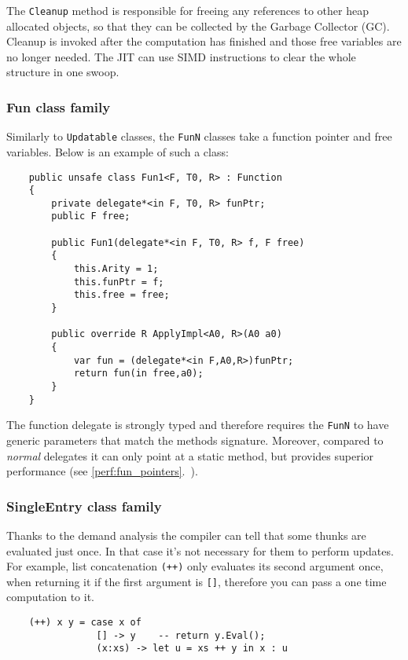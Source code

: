 \documentclass[en]{pracamgr}
\newcommand{\myref}[1]{\ref{#1}.~\textit{\nameref{#1}}}
\begin{document}
The \texttt{Cleanup} method is responsible for freeing
any references to other heap allocated objects, so that
they can be collected by the Garbage Collector (GC).
Cleanup is invoked after the computation has finished
and those free variables are no longer needed.
The JIT can use SIMD instructions to clear the whole
structure in one swoop.

\subsubsection{Fun class family}

Similarly to \texttt{Updatable} classes, the \texttt{FunN}
classes take a function pointer and free variables.
Below is an example of such a class:

\begin{verbatim}
    public unsafe class Fun1<F, T0, R> : Function
    {
        private delegate*<in F, T0, R> funPtr;
        public F free;

        public Fun1(delegate*<in F, T0, R> f, F free)
        {
            this.Arity = 1;
            this.funPtr = f;
            this.free = free;
        }

        public override R ApplyImpl<A0, R>(A0 a0)
        {
            var fun = (delegate*<in F,A0,R>)funPtr;
            return fun(in free,a0);
        }
    }
\end{verbatim}

The function delegate is strongly typed and therefore
requires the \texttt{FunN} to have generic parameters
that match the methods signature. Moreover, compared
to \textit{normal} delegates it can only point at a
static method, but provides superior performance (see \myref{perf:fun_pointers}).

\subsubsection{SingleEntry class family}

Thanks to the demand analysis \cite{demand_analysis} the compiler can
tell that some thunks are evaluated just once.
In that case it's not necessary for them to perform updates.
For example, list concatenation \texttt{(++)} only evaluates its
second argument once, when returning it if the first argument is \texttt{[]},
therefore you can pass a one time computation to it.

\begin{verbatim}
    (++) x y = case x of
                [] -> y    -- return y.Eval();
                (x:xs) -> let u = xs ++ y in x : u
\end{verbatim}
\end{document}
